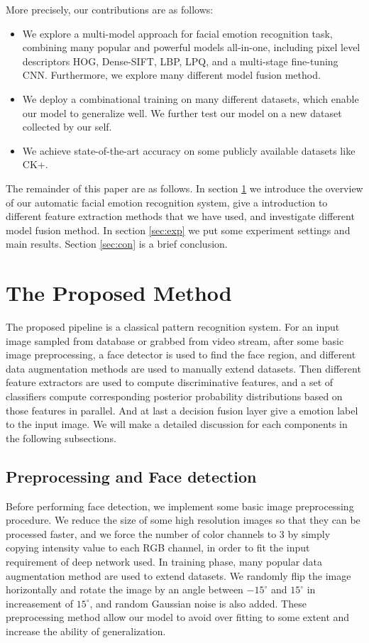 \documentclass[conference]{IEEEtran}
\begin{document}
More precisely, our contributions are as follows:
\begin{itemize}
\item We explore a multi-model approach for facial emotion recognition task, combining many popular and powerful models all-in-one, including pixel level descriptors HOG, Dense-SIFT, LBP, LPQ, and a multi-stage fine-tuning CNN. Furthermore, we explore many different model fusion method.
\item We deploy a combinational training on many different datasets, which enable our model to generalize well. We further test our model on a new dataset collected by our self.
\item We achieve state-of-the-art accuracy on some publicly available datasets like CK+.
\end{itemize}

The remainder of this paper are as follows. In section \ref{sec:method} we introduce the overview of our automatic facial emotion recognition system, give a introduction to different feature extraction methods that we have used, and investigate different model fusion method. In section \ref{sec:exp} we put some experiment settings and main results. Section \ref{sec:con} is a brief conclusion.

\section{The Proposed Method}
\label{sec:method}
The proposed pipeline is a classical pattern recognition system. For an input image sampled from database or grabbed from video stream, after some basic image preprocessing, a face detector is used to find the face region, and different data augmentation methods are used to manually extend datasets. Then different feature extractors are used to compute discriminative features, and a set of classifiers compute corresponding posterior probability distributions based on those features in parallel. And at last a decision fusion layer give a emotion label to the input image. We will make a detailed discussion for each components in the following subsections.

\subsection{Preprocessing and Face detection}
Before performing face detection, we implement some basic image preprocessing procedure. We reduce the size of some high resolution images so that they can be processed faster, and we force the number of color channels to 3 by simply copying intensity value to each RGB channel, in order to fit the input requirement of deep network used. In training phase, many popular data augmentation method are used to extend datasets. We randomly flip the image horizontally and rotate the image by an angle between $-15^{\circ}$ and $15^{\circ}$ in increasement of $15^{\circ}$, and random Gaussian noise is also added. These preprocessing method allow our model to avoid over fitting to some extent and increase the ability of generalization.
\end{document}
